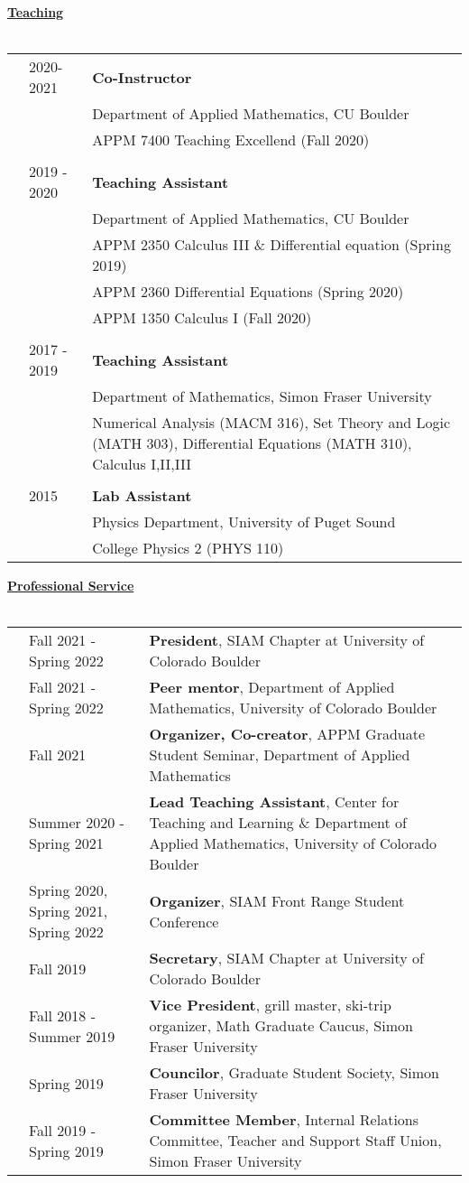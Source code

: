 \documentclass[letterpaper,11pt,oneside]{article}
\newcommand{\headr}[1]{\vspace{10pt}\uline{\Large{\textbf{#1}} \hfill } \\ \vspace{-10pt}\\}
\begin{document}
\headr{Teaching}

\begin{tabular}{@{} p{0.01cm} p{2cm} p{14cm}}
& 2020- 2021 & \textbf{Co-Instructor} \\
&		 & Department of Applied Mathematics, CU Boulder \\
&     & APPM 7400 Teaching Excellend (Fall 2020)\\
&&\\
& 2019 - 2020 & \textbf{Teaching Assistant} \\
&		 & Department of Applied Mathematics, CU Boulder \\
&     & APPM 2350 Calculus III \& Differential equation (Spring 2019)\\
&     & APPM 2360 Differential Equations (Spring 2020)\\
&     & APPM 1350 Calculus I (Fall 2020)\\
&&\\
& 2017 - 2019  & \textbf{Teaching Assistant} \\
&		 & Department of Mathematics, Simon Fraser University \\
&     & Numerical Analysis (MACM 316), Set Theory and Logic (MATH 303), Differential Equations (MATH 310), Calculus I,II,III\\
&&\\
& 2015  &\textbf{Lab Assistant} \\
&    &Physics Department, University of Puget Sound \\
&     & College Physics 2 (PHYS 110) \\
\end{tabular}

\headr{Professional Service}

\begin{tabular}{@{} p{0.01cm} p{4.5cm} p{12cm}}
& Fall 2021 - Spring 2022 & \textbf{President}, SIAM Chapter at University of Colorado Boulder\\
& Fall 2021 - Spring 2022  & \textbf{Peer mentor}, Department of Applied Mathematics, University of Colorado Boulder\\
& Fall 2021  & \textbf{Organizer, Co-creator}, APPM Graduate Student Seminar, Department of Applied Mathematics\\
& Summer 2020 - Spring 2021 & \textbf{Lead Teaching Assistant}, Center for Teaching and Learning \& Department of Applied Mathematics, University of Colorado Boulder\\
& Spring 2020, Spring 2021, Spring 2022  & \textbf{Organizer}, SIAM Front Range Student Conference \\
& Fall 2019  & \textbf{Secretary}, SIAM Chapter at University of Colorado Boulder\\
& Fall 2018 - Summer 2019 & \textbf{Vice President}, grill master, ski-trip organizer, Math Graduate Caucus, Simon Fraser University\\
& Spring 2019 & \textbf{Councilor}, Graduate Student Society, Simon Fraser University\\
& Fall 2019 - Spring 2019 & \textbf{Committee Member}, Internal Relations Committee, Teacher and Support Staff Union, Simon Fraser University \\
\end{tabular}
\end{document}
